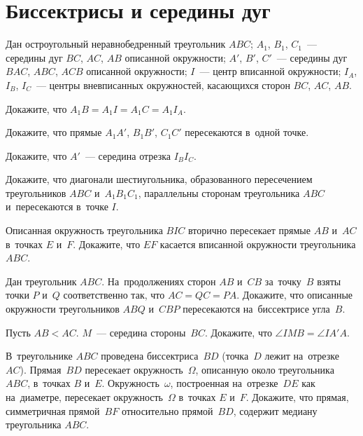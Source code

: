 
\section*{Биссектрисы и середины дуг}


Дан остроугольный неравнобедренный треугольник $ABC$;
$A_1$, $B_1$, $C_1$~--- середины дуг $BC$, $AC$, $AB$ описанной окружности;
$A'$, $B'$, $C'$~--- середины дуг $BAC$, $ABC$, $ACB$ описанной окружности;
$I$~--- центр вписанной окружности;
$I_A$, $I_B$, $I_C$~--- центры вневписанных окружностей, касающихся
сторон $BC$, $AC$, $AB$.

\begin{problems}

\item{}
Докажите, что
\(
    A_1 B = A_1 I = A_1 C = A_1 I_A
\).

\item
Докажите, что прямые $A_1 A'$, $B_1 B'$, $C_1 C'$ пересекаются в~одной точке.

\item
Докажите, что $A'$~--- середина отрезка $I_B I_C$.

\item
Докажите, что диагонали шестиугольника, образованного пересечением
треугольников $ABC$ и~$A_1 B_1 C_1$, параллельны сторонам треугольника $ABC$
и~пересекаются в~точке $I$.

\item
Описанная окружность треугольника $BIC$ вторично пересекает прямые $AB$ и~$AC$
в~точках $E$ и~$F$.
Докажите, что $EF$ касается вписанной окружности треугольника $ABC$.

\item
Дан треугольник $ABC$.
На~продолжениях сторон $AB$ и~$CB$ за~точку~$B$ взяты точки $P$ и~$Q$
соответственно так, что $AC = QC = PA$.
Докажите, что описанные окружности треугольников $ABQ$ и~$CBP$ пересекаются
на~биссектрисе угла~$B$.

\item
Пусть $AB < AC$.
$M$~--- середина стороны~$BC$.
Докажите, что $\angle {IMB} = \angle {IA'A}$.

\item
В~треугольнике $ABC$ проведена биссектриса~$BD$
(точка~$D$ лежит на~отрезке~$AC$).
Прямая~$BD$ пересекает окружность~$\Omega$, описанную около треугольника $ABC$,
в~точках $B$ и~$E$.
Окружность~$\omega$, построенная на~отрезке~$DE$ как на~диаметре, пересекает
окружность~$\Omega$ в~точках $E$ и~$F$.
Докажите, что прямая, симметричная прямой~$BF$ относительно прямой~$BD$,
содержит медиану треугольника $ABC$.


\end{problems}
